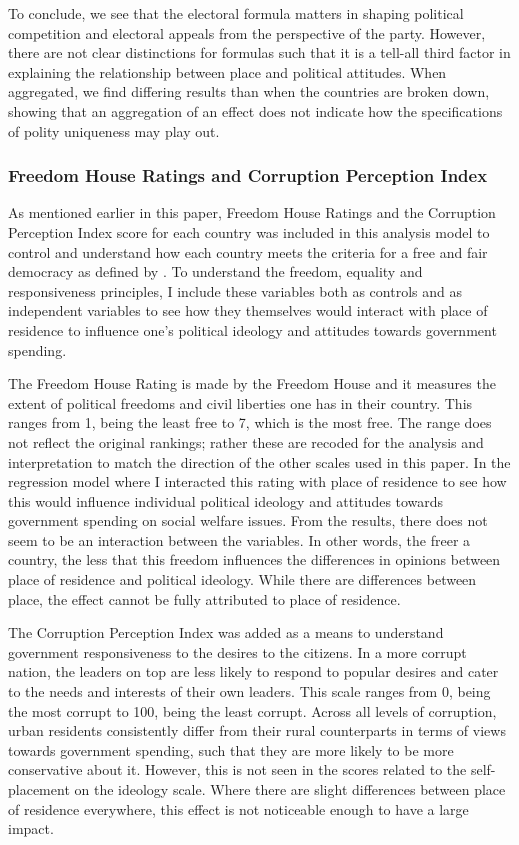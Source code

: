 \documentclass[12pt, titlepage]{article}
\begin{document}
To conclude, we see that the electoral formula matters in shaping political competition and electoral appeals from the perspective of the party. However, there are not clear distinctions for formulas such that it is a tell-all third factor in explaining the relationship between place and political attitudes. When aggregated, we find differing results than when the countries are broken down, showing that an aggregation of an effect does not indicate how the specifications of polity uniqueness may play out.

\subsubsection{Freedom House Ratings and Corruption Perception Index}

As mentioned earlier in this paper, Freedom House Ratings and the Corruption Perception Index score for each country was included in this analysis model to control and understand how each country meets the criteria for a free and fair democracy as defined by \cite{diamond2004overview}. To understand the freedom, equality and responsiveness principles, I include these variables both as controls and as independent variables to see how they themselves would interact with place of residence to influence one's political ideology and attitudes towards government spending. 

The Freedom House Rating is made by the Freedom House and it measures the extent of political freedoms and civil liberties one has in their country. This ranges from 1, being the least free to 7, which is the most free. The range does not reflect the original rankings; rather these are recoded for the analysis and interpretation to match the direction of the other scales used in this paper.  In the regression model where I interacted this rating with place of residence to see how this would influence individual political ideology and attitudes towards government spending on social welfare issues. From the results, there does not seem to be an interaction between the variables. In other words, the freer a country, the less that this freedom influences the differences in opinions between place of residence and political ideology. While there are differences between place, the effect cannot be fully attributed to place of residence.

The Corruption Perception Index was added as a means to understand government responsiveness to the desires to the citizens. In a more corrupt nation, the leaders on top are less likely to respond to popular desires and cater to the needs and interests of their own leaders. This scale ranges from 0, being the most corrupt to 100, being the least corrupt. Across all levels of corruption, urban residents consistently differ from their rural counterparts in terms of views towards government spending, such that they are more likely to be more conservative about it. However, this is not seen in the scores related to the self-placement on the ideology scale. Where there are slight differences between place of residence everywhere, this effect is not noticeable enough to have a large impact.
\end{document}
